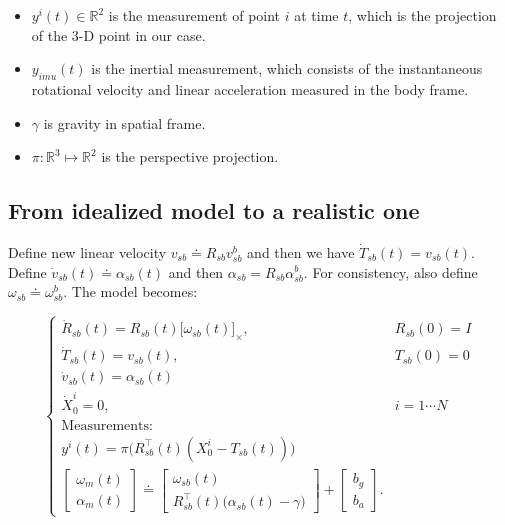 \documentclass[letter,10pt]{article}
\newcommand{\real}{\mathbb{R}}
\newcommand{\asym}[1]{{\lbrack #1\rbrack}_\times{}}
\begin{document}
\begin{itemize}
\item
$y^i(t) \in \real^2$ is the measurement of point $i$ at time $t$, which is the projection of the 3-D point in our case.

\item
$y_{imu}(t)$ is the inertial measurement, which consists of the instantaneous rotational velocity and linear acceleration measured in the body frame.

\item
$\gamma$ is gravity in spatial frame.

\item
$\pi: \real^3 \mapsto \real^2$ is the perspective projection.

\end{itemize}

\subsection{From idealized model to a realistic one}
Define new linear velocity $v_{sb}\doteq R_{sb}v_{sb}^b$ and then we have $\dot{T}_{sb}(t)=v_{sb}(t)$. Define $\dot{v}_{sb}(t)\doteq \alpha_{sb}(t)$ and then $\alpha_{sb}=R_{sb}\alpha_{sb}^b$. For consistency, also define $\omega_{sb}\doteq \omega_{sb}^b$. The model becomes:

\begin{equation*}
\begin{cases}
\dot{R}_{sb}(t)=R_{sb}(t)\asym{\omega_{sb}(t)}, &R_{sb}(0)=I\\
\dot{T}_{sb}(t)=v_{sb}(t), &T_{sb}(0)=0\\
\dot{v}_{sb}(t)=\alpha_{sb}(t)\\
\dot{X}_0^i=0, &i=1\cdots N\\
\text{Measurements:}\\
y^i(t)=\pi\big(R_{sb}^\top(t)(X_0^i-T_{sb}(t))\big)\\
\begin{bmatrix}
 \omega_m(t)\\
 \alpha_m(t)
\end{bmatrix}
\doteq
\begin{bmatrix}
	    \omega_{sb}(t)\\
	    R_{sb}^\top(t) \big(\alpha_{sb}(t)-\gamma \big)
           \end{bmatrix}
+           
           \begin{bmatrix}
           b_g\\
           b_a
           \end{bmatrix}.
\end{cases}
\end{equation*}
\end{document}
